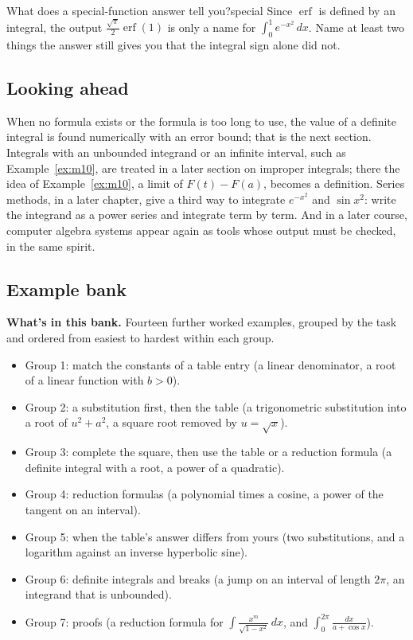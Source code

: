 \documentclass[11pt]{article}
\begin{document}
\begin{think}{What does a special-function answer tell you?}{special}
Since $\operatorname{erf}$ is defined by an integral, the output $\frac{\sqrt\pi}2\operatorname{erf}(1)$ is only a name for $\int_0^1e^{-x^2}\,dx$. Name at least two things the answer still gives you that the integral sign alone did not.
\end{think}

\subsection*{Looking ahead}

When no formula exists or the formula is too long to use, the value of a definite integral is found numerically with an error bound; that is the next section. Integrals with an unbounded integrand or an infinite interval, such as Example~\ref{ex:m10}, are treated in a later section on improper integrals; there the idea of Example~\ref{ex:m10}, a limit of $F(t)-F(a)$, becomes a definition. Series methods, in a later chapter, give a third way to integrate $e^{-x^2}$ and $\sin x^2$: write the integrand as a power series and integrate term by term. And in a later course, computer algebra systems appear again as tools whose output must be checked, in the same spirit.

\subsection*{Example bank}

\textbf{What's in this bank.} Fourteen further worked examples, grouped by the task and ordered from easiest to hardest within each group.
\begin{itemize}[nosep]
  \item Group 1: match the constants of a table entry (a linear denominator, a root of a linear function with $b>0$).
  \item Group 2: a substitution first, then the table (a trigonometric substitution into a root of $u^2+a^2$, a square root removed by $u=\sqrt x$).
  \item Group 3: complete the square, then use the table or a reduction formula (a definite integral with a root, a power of a quadratic).
  \item Group 4: reduction formulas (a polynomial times a cosine, a power of the tangent on an interval).
  \item Group 5: when the table's answer differs from yours (two substitutions, and a logarithm against an inverse hyperbolic sine).
  \item Group 6: definite integrals and breaks (a jump on an interval of length $2\pi$, an integrand that is unbounded).
  \item Group 7: proofs (a reduction formula for $\int\frac{x^m}{\sqrt{1-x^2}}\,dx$, and $\int_0^{2\pi}\frac{dx}{a+\cos x}$).
\end{itemize}
\end{document}
